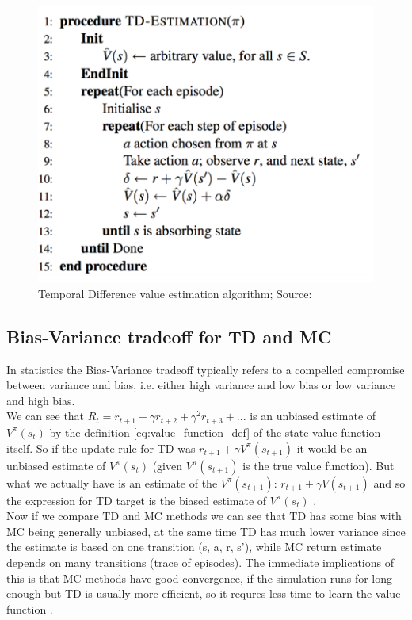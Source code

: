 \begin{figure}[h!]
  \centering
  \includegraphics[scale=0.6]{figures/TD_value_estimation.PNG}
  \caption{Temporal Difference value estimation algorithm; Source: \cite{lecture_mfl}}
  \label{fig:td}
\end{figure}

\subsection{Bias-Variance tradeoff for TD and MC}
In statistics the Bias-Variance tradeoff typically refers to 
a compelled compromise between variance and bias, i.e. either high variance and low bias or low variance and high bias. \\

We can see that $R_t = r_{t+1} + \gamma r_{t+2} + \gamma ^2 r_{t+3} + ...$ is an unbiased estimate of $V^{\pi} (s_t)$ by the definition \ref{eq:value_function_def} of the state value function itself. So if the update rule for TD was $r_{t+1} + \gamma V^{\pi}(s_{t+1})$ it would be an unbiased estimate of $V^{\pi}(s_{t})$ (given $V^{\pi}(s_{t+1})$ is the true value function). But what we actually have is an estimate of the $V^{\pi}(s_{t+1})$: $r_{t+1} + \gamma V(s_{t+1})$ and so the expression for TD target is the biased estimate of $V^{\pi}(s_t)$ \cite{lecture_mfl}. \\

Now if we compare TD and MC methods we can see that TD has some bias with MC being generally unbiased, at the same time TD has much lower variance since the estimate is based on one transition (s, a, r, s'), while MC return estimate depends on many transitions (trace of episodes). The immediate implications of this is that MC methods have good convergence,
if the simulation runs for long enough but TD is usually more efficient, so it requres less time to learn the value function \cite{lecture_mfl}.

